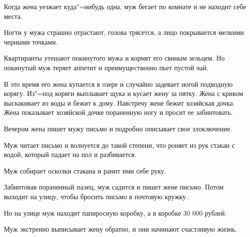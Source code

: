 
Когда   жена  уезжает куда"=нибудь  одна,
муж бегает по комнате и не находит себе места.

    Ногти у мужа страшно  отрастают,  голова
трясется, а лицо покрывается мелкими черными
точками.

    Квартиранты  утешают покинутого  мужа  и
кормят его свиным зельцем. Но  покинутый муж
теряет аппетит и преимущественно пьет пустой
чай.

    В это время его жена купается  в озере и
случайно задевает ногой подводную корягу. Из"=под коряги выплывает  щука и кусает жену за
пятку.  Жена с криком выскакивает из воды  и
бежит к дому. Навстречу жене бежит хозяйская
дочка. Жена показывает хозяйской дочке пораненную ногу и просит ее забинтовать.

    Вечером жена пишет мужу письмо и подробно описывает свое злоключение.

    Муж читает письмо и волнуется  до  такой
степени,  что  роняет из рук стакан с водой,
который падает на пол и разбивается.

    Муж собирает осколки стакана и ранит ими
себе руку.

    Забинтовав пораненный  палец, муж садится и пишет  жене  письмо.  Потом  выходит на
улицу, чтобы бросить письмо в почтовую кружку.

    Но  на улице муж находит папиросную  коробку, а в коробке 30 000 рублей.

    Муж  экстренно  выписывает жену обратно,
и они начинают счастливую жизнь.
